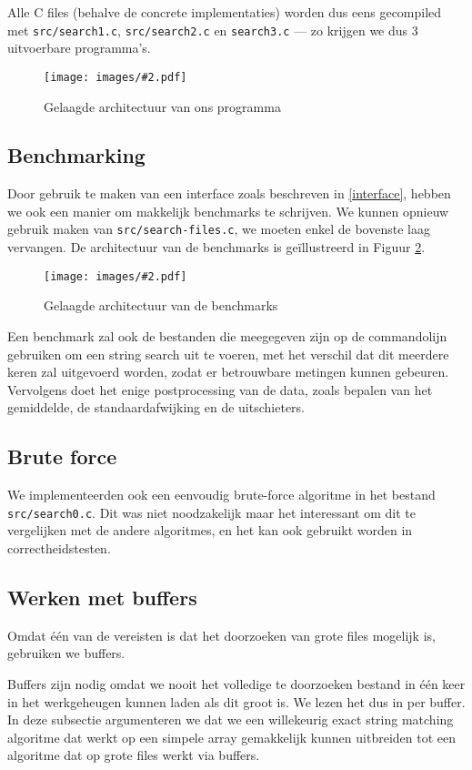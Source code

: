 \documentclass[a4paper,11pt]{article}
\newcommand{\image}[3][1]{
    \begin{figure}
    \begin{center}
    \texttt{[image: images/\#2.pdf]}
    \caption{#3}
    \label{fig:#2}
    \end{center}
    \end{figure}
}
\begin{document}
Alle C files (behalve de concrete implementaties) worden dus eens gecompiled met
\verb#src/search1.c#, \verb#src/search2.c# en \verb#search3.c# — zo krijgen we
dus 3 uitvoerbare programma's.

\image[0.6]{layers-main}{Gelaagde architectuur van ons programma}

\subsection{Benchmarking}

Door gebruik te maken van een interface zoals beschreven in \ref{interface},
hebben we ook een manier om makkelijk benchmarks te schrijven. We kunnen opnieuw
gebruik maken van \verb#src/search-files.c#, we moeten enkel de bovenste laag
vervangen. De architectuur van de benchmarks is ge\"illustreerd in Figuur
\ref{fig:layers-bench}.

\image[0.6]{layers-bench}{Gelaagde architectuur van de benchmarks}

Een benchmark zal ook de bestanden die meegegeven zijn op de commandolijn
gebruiken om een string search uit te voeren, met het verschil dat dit meerdere
keren zal uitgevoerd worden, zodat er betrouwbare metingen kunnen gebeuren.
Vervolgens doet het enige postprocessing van de data, zoals bepalen van het
gemiddelde, de standaardafwijking en de uitschieters.

\subsection{Brute force}
\label{brute-force}

We implementeerden ook een eenvoudig brute-force algoritme in het bestand
\verb#src/search0.c#. Dit was niet noodzakelijk maar het interessant om dit te
vergelijken met de andere algoritmes, en het kan ook gebruikt worden in
correctheidstesten.

\subsection{Werken met buffers}
\label{buffers}

Omdat \'e\'en van de vereisten is dat het doorzoeken van grote files mogelijk
is, gebruiken we buffers.

Buffers zijn nodig omdat we nooit het volledige te doorzoeken bestand in \'e\'en
keer in het werkgeheugen kunnen laden als dit groot is. We lezen het dus in per
buffer. In deze subsectie argumenteren we dat we een willekeurig exact string
matching algoritme dat werkt op een simpele array gemakkelijk kunnen uitbreiden
tot een algoritme dat op grote files werkt via buffers.
\end{document}
